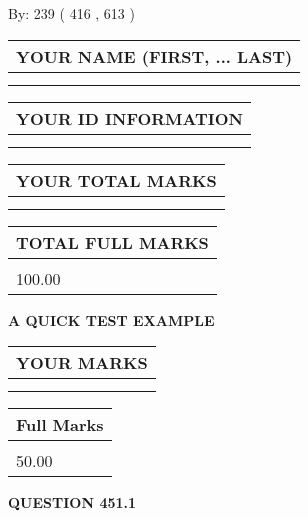 \documentclass[12pt]{article}
\begin{document}
   
\hspace{1.0in} By: 
 239 ( 416 ,  613 )
   
   
   
   
\newpage 
\setcounter{page}{ 
   451001 } 
   
   
   
   
\noindent\begin{tabular}{|l|}
\hline
YOUR NAME (FIRST, ... LAST)  \\
\hline
 \\ 
 \\ 
\hline
\end{tabular}
\hspace{0.05in} \begin{tabular}{|l|}
\hline
 YOUR   ID   INFORMATION  \\
\hline
 \\ 
 \\ 
\hline
\end{tabular}
   
   
\vspace{0.2in}\noindent\begin{tabular}{|l|}
\hline
YOUR TOTAL MARKS  \\
\hline
 \\ 
 \\ 
\hline
\end{tabular}
\hspace{0.05in} \begin{tabular}{|l|}
\hline
TOTAL FULL MARKS  \\
\hline
 \\ 
100.00 \\
\hline
\end{tabular}
   
   
 \vspace{0.2in}
{\LARGE {\textbf{ A QUICK TEST EXAMPLE}}}
   
   
  
\vspace{0.2in}
  
\noindent\begin{tabular}{|l|}
\hline
 YOUR MARKS  \\
\hline
 \\ 
 \\ 
\hline
\end{tabular}
\hspace{0.05in} \begin{tabular}{|l|}
\hline
 Full Marks  \\
\hline
 \\ 
50.00 \\
\hline
\end{tabular}
{\textbf{\Large{QUESTION
451.1 
}}}
  
\end{document}
